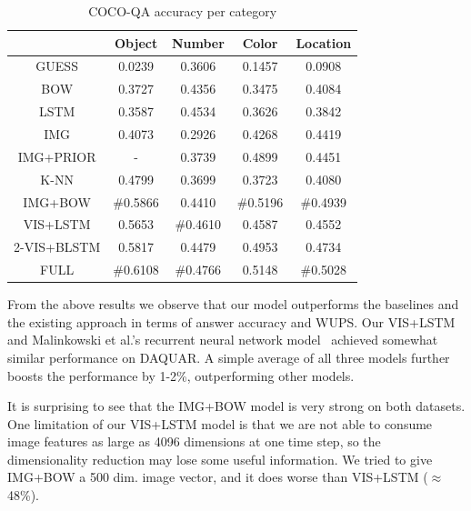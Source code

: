 \begin{table}[h]
\caption{COCO-QA accuracy per category}
\label{tab:cocoqa_acc_breakdown}
\begin{center}
\begin{small}
\begin{sc}
\begin{tabular}{c c c c c}
\hline
           &   Object  &   Number &   Color   & Location \\
\hline
GUESS      &   0.0239  &   0.3606 &   0.1457  & 0.0908   \\
BOW        &   0.3727  &   0.4356 &   0.3475  & 0.4084   \\
LSTM       &   0.3587  &   0.4534 &   0.3626  & 0.3842   \\
IMG        &   0.4073  &   0.2926 &   0.4268  & 0.4419   \\
IMG+PRIOR  &   -       &   0.3739 &   0.4899  & 0.4451   \\
K-NN       &   0.4799  &   0.3699 &   0.3723  & 0.4080   \\
IMG+BOW    &\#{0.5866} &   0.4410 &\#{0.5196} &\#{0.4939}\\
VIS+LSTM   &   0.5653  &\#{0.4610}&   0.4587  & 0.4552   \\
2-VIS+BLSTM&   0.5817  &   0.4479 &   0.4953  & 0.4734   \\
FULL       &\#{0.6108} &\#{0.4766}&   0.5148  &\#{0.5028}\\
\hline
\end{tabular}
\end{sc}
\end{small}
\end{center}
\end{table}

From the above results we observe that our model outperforms the baselines and
the existing approach in terms of answer accuracy and WUPS. Our VIS+LSTM and
Malinkowski et al.'s recurrent neural network model~\cite{malinowski15} achieved
somewhat similar performance on DAQUAR. A simple average of all three models
further boosts the performance by 1-2\%, outperforming other models.

It is surprising to see that the IMG+BOW model is very strong on both datasets. One
limitation of our VIS+LSTM model is that we are not able to consume image
features as large as 4096 dimensions at one time step, so the dimensionality
reduction may lose some useful information. We tried to give IMG+BOW a 500 dim.
image vector, and it does worse than VIS+LSTM ($\approx$48\%). 

